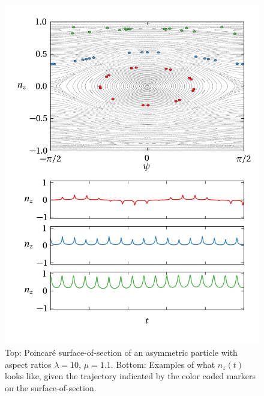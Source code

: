 \documentclass[thesis.tex]{subfiles}
\begin{document}
\begin{figure}
\includegraphics[width=12cm]{figs/poincareB.png}%
\caption{\label{fig:poincareB} Top: Poincar\'e surface-of-section of an asymmetric particle with aspect ratios $\lambda=10$, $\mu=1.1$. Bottom: Examples of what $n_z(t)$ looks like, given the trajectory indicated by the color coded markers on the surface-of-section. }%
\end{figure}
\end{document}
